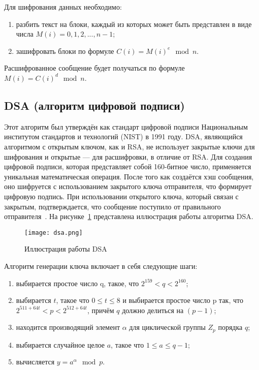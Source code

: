 Для шифрования данных необходимо:
\begin{enumerate}
	\item разбить текст на блоки, каждый из которых может быть представлен в виде числа $M(i) = 0, 1, 2, ..., n - 1$;
	\item зашифровать блоки по формуле $C(i) = M(i)^e \mod n$.
\end{enumerate}

Расшифрованное сообщение будет получаться по формуле $M(i) = C(i)^d \mod n$. 

\subsection{DSA (алгоритм цифровой подписи)}

Этот алгоритм был утверждён как стандарт цифровой подписи Национальным институтом стандартов и технологий (NIST) в 1991 году. DSA, являющийся алгоритмом с открытым ключом, как и RSA, не использует закрытые ключи для шифрования и открытые — для расшифровки, в отличие от RSA. Для создания цифровой подписи, которая представляет собой 160-битное число, применяется уникальная математическая операция. После того как создаётся хэш сообщения, оно шифруется с использованием закрытого ключа отправителя, что формирует цифровую подпись. При использовании открытого ключа, который связан с закрытым, подтверждается, что сообщение поступило от правильного отправителя~\cite{encrypting}. На рисунке~\ref{fig:dsa} представлена иллюстрация работы алгоритма DSA.

\begin{figure}[H]
	\centering
	\texttt{[image: dsa.png]}
	\caption{Иллюстрация работы DSA}
	\label{fig:dsa}
\end{figure}

Алгоритм генерации ключа включает в себя следующие шаги:
\begin{enumerate}
	\item выбирается простое число q, такое, что $2^{159} < q < 2^{160}$;
	\item выбирается $t$, такое что $0 \leq t \leq 8$ и выбирается простое число p так, что $2^{511+64t} < p < 2^{512+64t}$, причём $q$ должно делиться на $(p-1)$;
	\item находится производящий элемент $\alpha$ для циклической группы $Z_p$ порядка $q$;
	\item выбирается случайное целое $a$, такое что $1 \leq a \leq q-1$;
	\item вычисляется $y = a^\alpha \mod p$.
\end{enumerate}

